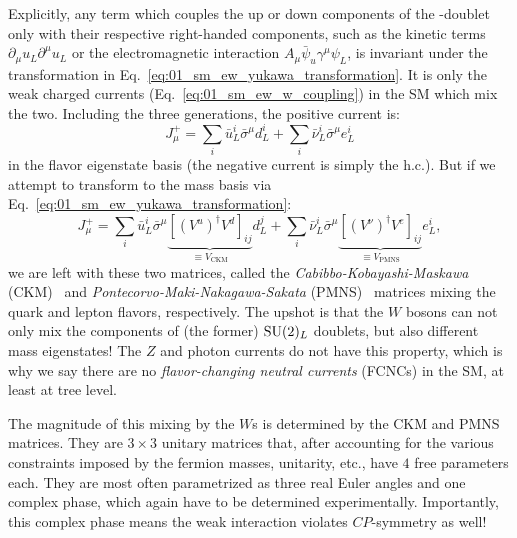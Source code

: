 Explicitly, any term which couples the up or down components of the \SU[2]-doublet only with their respective right-handed components, such as the kinetic terms $\partial_\mu u_L \partial^\mu u_L$ or the electromagnetic interaction $A_\mu \bar \psi_u \gamma^\mu \psi_L$, is invariant under the transformation in Eq.~\ref{eq:01_sm_ew_yukawa_transformation}.
It is only the weak charged currents (Eq.~\ref{eq:01_sm_ew_w_coupling}) in the SM which mix the two.
Including the three generations, the positive current is:
\begin{equation}
	\label{eq:01_sm_ew_flavor_jmu}
	J^+_\mu = \sum_i \bar u^i_L \bar \sigma^\mu d^i_L + \sum_i \bar \nu^i_L \bar \sigma^\mu e^i_L
\end{equation}
in the flavor eigenstate basis (the negative current is simply the h.c.).
But if we attempt to transform to the mass basis via Eq.~\ref{eq:01_sm_ew_yukawa_transformation}:
\begin{equation}
	\label{eq:01_sm_ew_flavor_jmu_ckm}
	J^+_\mu = \sum_i \bar u^i_L \bar \sigma^\mu \underbrace{[(V^u)^\dagger V^d]_{ij}}_{\equiv V_{\mathrm{CKM}}} d^j_L + \sum_i \bar \nu^i_L \bar \sigma^\mu \underbrace{[(V^\nu)^\dagger V^e]_{ij}}_{\equiv V_{\mathrm{PMNS}}} e^i_L,
\end{equation}
we are left with these two matrices, called the \textit{Cabibbo-Kobayashi-Maskawa} (CKM)~\cite{Kobayashi:1973fv} and \textit{Pontecorvo-Maki-Nakagawa-Sakata} (PMNS)~\cite{Maki:1962mu} matrices mixing the quark and lepton flavors, respectively.
The upshot is that the $W$ bosons can not only mix the components of (the former) $\SU[2]_L$ doublets, but also different mass eigenstates!
The $Z$ and photon currents do not have this property, which is why we say there are no \textit{flavor-changing neutral currents} (FCNCs) in the SM, at least at tree level.

The magnitude of this mixing by the $W$s is determined by the CKM and PMNS matrices.
They are $3 \times 3$ unitary matrices that, after accounting for the various constraints imposed by the fermion masses, unitarity, etc., have $4$ free parameters each.
They are most often parametrized as three real Euler angles and one complex phase, which again have to be determined experimentally.
Importantly, this complex phase means the weak interaction violates $CP$-symmetry as well!


